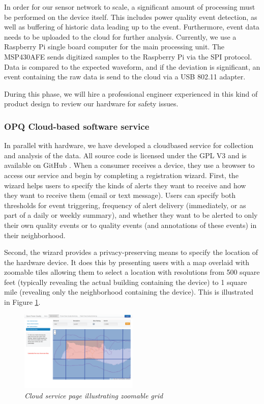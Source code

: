 In order for our sensor network to scale, a significant amount of processing must be performed on the device itself. This includes power quality event detection, as well as buffering of historic data leading up to the event. Furthermore, event data needs to be uploaded to the cloud for further analysis. Currently, we use a Raspberry Pi single board computer for the main processing unit. The MSP430AFE sends digitized samples to the Raspberry Pi via the SPI protocol. Data is compared to the expected waveform, and if the deviation is significant, an event containing the raw data is send to the cloud via a USB 802.11 adapter.

During this phase, we will hire a professional engineer experienced in this kind of product design to review our hardware for safety issues. 

\subsubsection{OPQ Cloud-based software service}

In parallel with hardware, we have developed a cloudbased service for collection and analysis of the data. All source code is licensed under the GPL V3 and is available on GitHub \cite{opq-github}.  When a consumer receives a device, they use a browser to access our service and begin by completing a registration wizard. First, the wizard helps users to specify the kinds of alerts they want to receive and how they want to receive them (email or text message).  Users can specify both thresholds for event triggering, frequency of alert delivery (immediately, or as part of a daily or weekly summary), and whether they want to be alerted to only their own quality events or to quality events (and annotations of these events) in their neighborhood.  

Second, the wizard provides a privacy-preserving means to specify the location of the hardware device. It does this by presenting users with a map overlaid with zoomable tiles allowing them to select a location with resolutions from 500 square feet (typically revealing the actual building containing the device) to 1 square mile (revealing only the neighborhood containing the device). This is illustrated in Figure \ref{fig:cloud-grid}.

\begin{figure}
  \includegraphics[width=0.5\textwidth]{figures/cloud-grid.eps}
  \caption{\em \small Cloud service page illustrating zoomable grid}
  \label{fig:cloud-grid}
\end{figure} 

